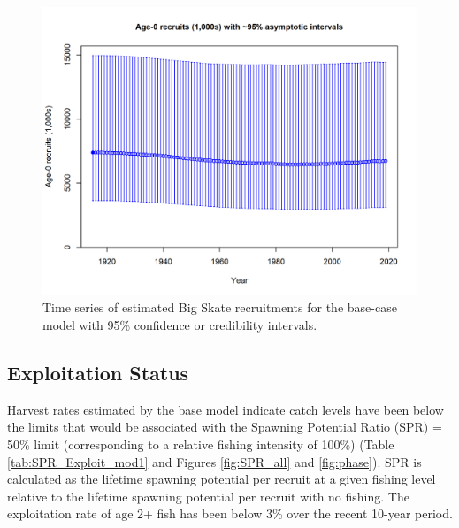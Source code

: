 \documentclass[12pt,]{article}
\begin{document}
\begin{figure}
\centering
\includegraphics{r4ss/plots_mod1/ts11_Age-0_recruits_(1000s)_with_95_asymptotic_intervals.png}
\caption{Time series of estimated Big Skate recruitments for the
base-case model with 95\% confidence or credibility intervals.
\label{fig:Recruits_all}}
\end{figure}

\FloatBarrier

\hypertarget{exploitation-status}{%
\subsection*{Exploitation Status}\label{exploitation-status}}

Harvest rates estimated by the base model indicate catch levels have
been below the limits that would be associated with the Spawning
Potential Ratio (SPR) = 50\% limit (corresponding to a relative fishing
intensity of 100\%) (Table \ref{tab:SPR_Exploit_mod1} and Figures
\ref{fig:SPR_all} and \ref{fig:phase}). SPR is calculated as the
lifetime spawning potential per recruit at a given fishing level
relative to the lifetime spawning potential per recruit with no fishing.
The exploitation rate of age 2+ fish has been below 3\% over the recent
10-year period.

\vspace{.5cm}

\FloatBarrier
\end{document}

